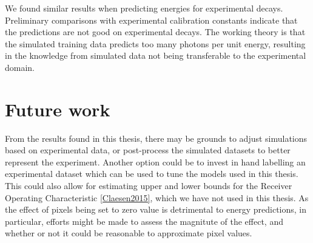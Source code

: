 We found similar results when predicting energies for experimental decays. Preliminary comparisons
with experimental calibration constants indicate that the predictions are not good on experimental
decays. The working theory is that the simulated training data predicts too many photons per unit
energy, resulting in the knowledge from simulated data not being transferable to the experimental
domain.

\section{Future work}
From the results found in this thesis, there may be grounds to adjust simulations based on
experimental data, or post-process the simulated datasets to better represent the experiment.
Another option could be to invest in hand labelling an experimental dataset which can be used
to tune the models used in this thesis. This could also allow for estimating upper and lower bounds
for the Receiver Operating Characteristic \ref{Claesen2015}, which we have not used in this thesis.
As the effect of pixels being set to zero value is detrimental to energy predictions, in particular,
efforts might be made to assess the magnitute of the effect, and whether or not it could be reasonable
to approximate pixel values.